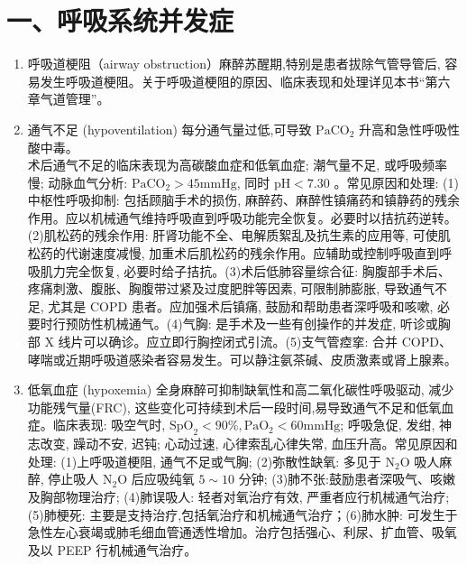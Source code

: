 \documentclass[10pt]{article}
\begin{document}
\section*{一、呼吸系统并发症}
\begin{enumerate}
  \item 呼吸道梗阻（airway obstruction）麻醉苏醒期,特别是患者拔除气管导管后, 容易发生呼吸道梗阻。关于呼吸道梗阻的原因、临床表现和处理详见本书“第六章气道管理”。

  \item 通气不足 (hypoventilation) 每分通气量过低,可导致 $\mathrm{PaCO}_{2}$ 升高和急性呼吸性酸中毒。\\
术后通气不足的临床表现为高碳酸血症和低氧血症; 潮气量不足, 或呼吸频率慢; 动脉血气分析: $\mathrm{PaCO}_{2}>45 \mathrm{mmHg}$, 同时 $\mathrm{pH}<7.30$ 。常见原因和处理: (1)中枢性呼吸抑制: 包括顾脑手术的损伤, 麻醉药、麻醉性镇痛药和镇静药的残余作用。应以机械通气维持呼吸直到呼吸功能完全恢复。必要时以拮抗药逆转。(2)肌松药的残余作用: 肝肾功能不全、电解质絮乱及抗生素的应用等, 可使肌松药的代谢速度减慢, 加重术后肌松药的残余作用。应辅助或控制呼吸直到呼吸肌力完全恢复, 必要时给子拮抗。(3)术后低肺容量综合征: 胸腹部手术后、疼痛刺激、腹胀、胸腹带过紧及过度肥胖等因素, 可限制肺膨胀, 导致通气不足, 尤其是 COPD 患者。应加强术后镇痛, 鼓励和帮助患者深呼吸和咳嗽, 必要时行预防性机械通气。(4)气胸: 是手术及一些有创操作的并发症, 听诊或胸部 X 线片可以确诊。应立即行胸控闭式引流。(5)支气管㾤挛: 合并 COPD、哮喘或近期呼吸道感染者容易发生。可以静注氨茶碱、皮质激素或肾上腺素。

  \item 低氧血症 (hypoxemia) 全身麻醉可抑制缺氧性和高二氧化碳性呼吸驱动, 减少功能残气量(FRC), 这些变化可持续到术后一段时间,易导致通气不足和低氧血症。临床表现: 吸空气时, $\mathrm{SpO}_{2}<90 \%, \mathrm{PaO}_{2}<60 \mathrm{mmHg}$; 呼吸急促, 发绀, 神志改变, 躁动不安, 迟钝; 心动过速, 心律索乱心律失常, 血压升高。常见原因和处理: (1)上呼吸道梗阻, 通气不足或气胸; (2)弥散性缺氧: 多见于 $\mathrm{N}_{2} \mathrm{O}$ 吸人麻醉, 停止吸人 $\mathrm{N}_{2} \mathrm{O}$ 后应吸纯氧 $5 \sim 10$ 分钟; (3)肺不张:鼓励患者深吸气、咳嫩及胸部物理治疗; (4)肺误吸人: 轻者对氧治疗有效, 严重者应行机械通气治疗; (5)肺梗死: 主要是支持治疗,包括氧治疗和机械通气治疗；(6)肺水肿: 可发生于急性左心衰竭或肺毛细血管通透性增加。治疗包括强心、利尿、扩血管、吸氧及以 PEEP 行机械通气治疗。

\end{enumerate}
\end{document}
